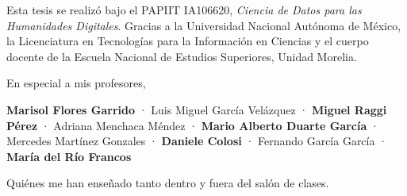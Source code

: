 \label{chapter:agradecimientos}

{
\color{gray}
Esta tesis se realizó bajo el PAPIIT IA106620, \textit{Ciencia de Datos para las Humanidades Digitales}. Gracias a la Universidad Nacional Autónoma de México, la Licenciatura en Tecnologías para la Información en Ciencias y el cuerpo docente de la Escuela Nacional de Estudios Superiores, Unidad Morelia.
}

{ 
\color{gray}

En especial a mis profesores,

\textbf{ Marisol Flores Garrido} · Luis Miguel García Velázquez · \textbf{Miguel Raggi Pérez} · Adriana Menchaca Méndez · \textbf{Mario Alberto Duarte García} · Mercedes Martínez Gonzales · \textbf{Daniele Colosi} · Fernando García García · \textbf{María del Río Francos}

Quiénes me han enseñado tanto dentro y fuera del salón de clases.
}